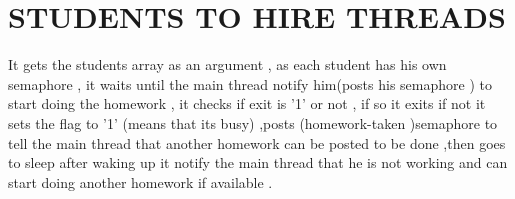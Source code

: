 \documentclass{article}
\begin{document}
\maketitle

\section{STUDENTS TO HIRE THREADS   }
It gets the students array as an argument , as each student has his own semaphore , it waits until the main thread notify him(posts his semaphore ) to start doing the homework , it checks if exit is '1' or not , if so it exits if not it sets the flag to '1' (means that its busy) ,posts (homework-taken )semaphore to tell the main thread that another homework can be posted to be done ,then goes to sleep 
after waking up it notify the main thread that he  is not working and can start doing another homework if available . 
\end{document}
